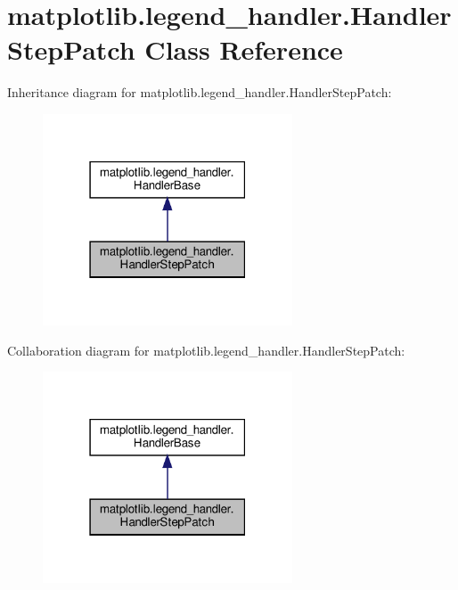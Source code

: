 \hypertarget{classmatplotlib_1_1legend__handler_1_1HandlerStepPatch}{}\section{matplotlib.\+legend\+\_\+handler.\+Handler\+Step\+Patch Class Reference}
\label{classmatplotlib_1_1legend__handler_1_1HandlerStepPatch}


Inheritance diagram for matplotlib.\+legend\+\_\+handler.\+Handler\+Step\+Patch\+:
\nopagebreak
\begin{figure}[H]
\begin{center}
\leavevmode
\includegraphics[width=210pt]{classmatplotlib_1_1legend__handler_1_1HandlerStepPatch__inherit__graph}
\end{center}
\end{figure}


Collaboration diagram for matplotlib.\+legend\+\_\+handler.\+Handler\+Step\+Patch\+:
\nopagebreak
\begin{figure}[H]
\begin{center}
\leavevmode
\includegraphics[width=210pt]{classmatplotlib_1_1legend__handler_1_1HandlerStepPatch__coll__graph}
\end{center}
\end{figure}

